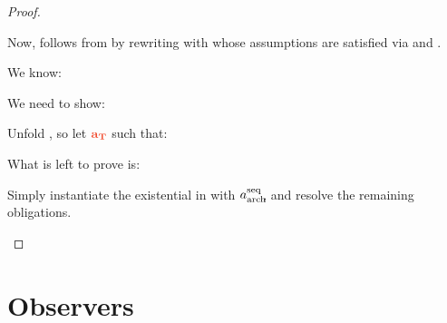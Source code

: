 \documentclass[12pt]{article}
\begin{document}
\begin{proof}
\begin{proofcase}{\subseteq}
    Now,  follows from  by rewriting with  whose assumptions are satisfied via  and .
  \end{proofcase}
  \begin{proofcase}{\supseteq}
    We know: 
    \begin{passumptions}
    \end{passumptions}
    We need to show:
    \begin{goals}
    \end{goals}
    Unfold , so let $\trg{\varEvent[T]}$ such that:
    \begin{passumptions}
    \end{passumptions}
    What is left to prove is:
    \begin{goals}
    \end{goals}
    Simply instantiate the existential in  with $a^{\text{seq}}_{\text{arch}}\kern-3pt{}$,  and  resolve the remaining obligations.
  \end{proofcase}
\end{proof}

\section{Observers}\label{sec:observers}
\end{document}
